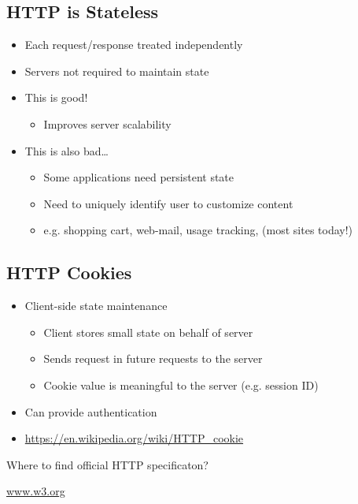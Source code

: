 \subsection{HTTP is Stateless}
\begin{itemize}[nosep]
    \item Each request/response treated independently
    \item Servers not required to maintain state
    \item This is good!
          \begin{itemize}[nosep]
              \item Improves server scalability
          \end{itemize}
    \item This is also bad\dots
          \begin{itemize}[nosep]
              \item Some applications need persistent state
              \item Need to uniquely identify user to customize content
              \item e.g. shopping cart, web-mail, usage tracking, (most sites today!)
          \end{itemize}
\end{itemize}
\subsection{HTTP Cookies}
\begin{itemize}[nosep]
    \item Client-side state maintenance
          \begin{itemize}[nosep]
              \item Client stores small state on behalf of server
              \item Sends request in future requests to the server
              \item Cookie value is meaningful to the server (e.g. session ID)
          \end{itemize}
    \item Can provide authentication
    \item \url{https://en.wikipedia.org/wiki/HTTP_cookie}
\end{itemize}
Where to ﬁnd oﬃcial HTTP speciﬁcaton?

\url{www.w3.org}
